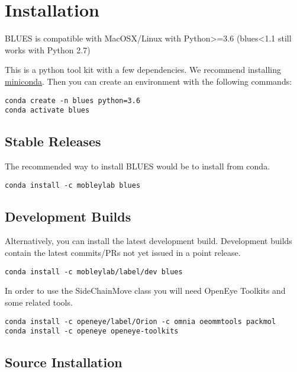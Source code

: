 \hypertarget{installation}{%
\section{Installation}\label{installation}}

BLUES is compatible with MacOSX/Linux with Python\textgreater=3.6
(blues\textless1.1 still works with Python 2.7)

This is a python tool kit with a few dependencies. We recommend
installing \href{http://conda.pydata.org/miniconda.html}{miniconda}.
Then you can create an environment with the following commands:

\begin{verbatim}
conda create -n blues python=3.6
conda activate blues
\end{verbatim}

\hypertarget{stable-releases}{%
\subsection*{Stable Releases}\label{stable-releases}}

The recommended way to install BLUES would be to install from conda.

\begin{verbatim}
conda install -c mobleylab blues
\end{verbatim}

\hypertarget{development-builds}{%
\subsection*{Development Builds}\label{development-builds}}

Alternatively, you can install the latest development build. Development
builds contain the latest commits/PRs not yet issued in a point release.

\begin{verbatim}
conda install -c mobleylab/label/dev blues
\end{verbatim}

In order to use the {SideChainMove} class you will need OpenEye Toolkits
and some related tools.

\begin{verbatim}
conda install -c openeye/label/Orion -c omnia oeommtools packmol
conda install -c openeye openeye-toolkits
\end{verbatim}

\hypertarget{source-installation}{%
\subsection*{Source Installation}\label{source-installation}}

